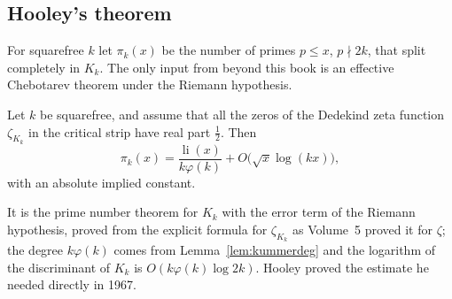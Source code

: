 \subsection*{Hooley's theorem}

For squarefree $k$ let $\pi_k(x)$ be the number of primes $p\le x$, $p\nmid2k$, that split completely in $K_k$. The only input from beyond this book is an effective Chebotarev theorem under the Riemann hypothesis.

\begin{theorem}\label{thm:effcheb}
Let $k$ be squarefree, and assume that all the zeros of the Dedekind zeta function $\zeta_{K_k}$ in the critical strip have real part $\frac12$. Then
\[
\pi_k(x)=\frac{\operatorname{li}(x)}{k\varphi(k)}+O\bigl(\sqrt x\log(kx)\bigr),
\]
with an absolute implied constant.
\end{theorem}

It is the prime number theorem for $K_k$ with the error term of the Riemann hypothesis, proved from the explicit formula for $\zeta_{K_k}$ as Volume~5 proved it for $\zeta$; the degree $k\varphi(k)$ comes from Lemma~\ref{lem:kummerdeg} and the logarithm of the discriminant of $K_k$ is $O(k\varphi(k)\log 2k)$. Hooley proved the estimate he needed directly in 1967.

